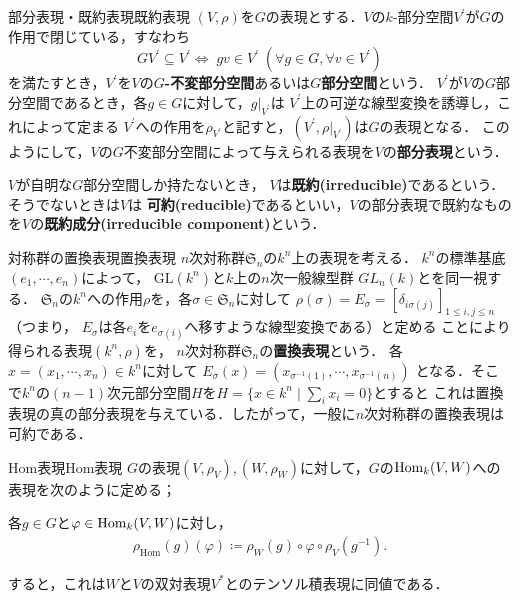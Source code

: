 \documentclass[a4paper,thmnumbering=section,eqnumbering=section]{summary-ja}
\newcommand{\gl}{\textrm{GL}}
\begin{document}
\begin{definition}{部分表現・既約表現}{既約表現}
    $(V,\rho)$を$G$の表現とする．$V$の$k$-部分空間$V^\prime$が$G$の作用で閉じている，すなわち
    \[ G V^\prime \subseteq V^\prime \Longleftrightarrow 
    \; gv \in V^\prime \; \left(\forall g\in G, \forall v\in V^\prime\right)\]
    を満たすとき，$V^\prime$を$V$の\textbf{$G$-不変部分空間}あるいは\textbf{$G$部分空間}という．
    $V^\prime$が$V$の$G$部分空間であるとき，各$g\in G$に対して，$g|_{V^\prime}$は
    $V^\prime$上の可逆な線型変換を誘導し，これによって定まる
    $V^\prime$への作用を$\rho_{V^\prime}$と記すと，$(V^\prime, \rho|_{V^\prime})$は$G$の表現となる．
    このようにして，$V$の$G$不変部分空間によって与えられる表現を$V$の\textbf{部分表現}という．\par
    \quad$V$が自明な$G$部分空間しか持たないとき，
    $V$は\textbf{既約(irreducible)}であるという．そうでないときは$V$は
    \textbf{可約(reducible)}であるといい，$V$の部分表現で既約なものを$V$の\textbf{既約成分(irreducible component)}という．
    
\end{definition}

\begin{example}{対称群の置換表現}{置換表現}
    $n$次対称群$\mathfrak{S}_n$の$k^n$上の表現を考える．
    $k^n$の標準基底$(e_1, \cdots, e_n)$によって， $\gl(k^n)$と$k$上の$n$次一般線型群
    $GL_n(k)$とを同一視する．
    $\mathfrak{S}_n$の$k^n$への作用$\rho$を，各$\sigma\in\mathfrak{S}_n$に対して
    $\rho(\sigma)= E_\sigma = [\delta_{i\sigma(j)}]_{1\leq i,j\leq n}$
    （つまり， $E_\sigma$は各$e_i$を$e_{\sigma(i)}$へ移すような線型変換である）と定める
    ことにより得られる表現$(k^n, \rho)$を， $n$次対称群$\mathfrak{S}_n$の\textbf{置換表現}という．
    各$x=(x_1, \cdots, x_n)\in k^n$に対して
    $E_\sigma(x) = (x_{\sigma^{-1}(1)}, \cdots, x_{\sigma^{-1}(n)})$
    となる．そこで$k^n$の$(n-1)$次元部分空間$H$を$H=\{ x\in k^n \;|\; \sum_i x_i = 0\}$とすると
    これは置換表現の真の部分表現を与えている．したがって，一般に$n$次対称群の置換表現は可約である．
\end{example}

\begin{example}{Hom表現}{Hom表現}
    $G$の表現$(V,\rho_V), (W,\rho_W)$に対して，$G$の$\operatorname{Hom}_k(V,W)$への表現を次のように定める；
    \begin{center}
        各$g\in G$と$\varphi\in\operatorname{Hom}_k(V,W)$に対し，\vspace{-10pt}
        \begin{align}
            \rho_{\textrm{Hom}}(g)(\varphi) \coloneqq \rho_W(g)\circ\varphi\circ\rho_V(g^{-1}).
        \end{align}
    \end{center}
    すると，これは$W$と$V$の双対表現$V^\ast$とのテンソル積表現に同値である．

\end{example}
\end{document}
